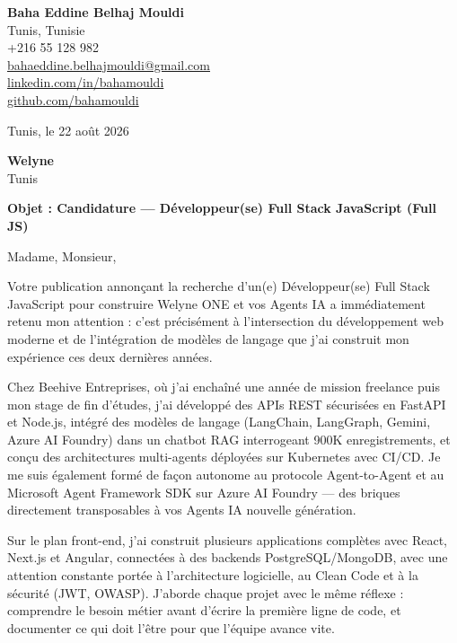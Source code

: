 \documentclass[a4paper,11pt]{article}
\begin{document}
\begin{flushright}
{\bfseries Baha Eddine Belhaj Mouldi}\\
Tunis, Tunisie\\
+216 55 128 982\\
\href{mailto:bahaeddine.belhajmouldi@gmail.com}{bahaeddine.belhajmouldi@gmail.com}\\
\href{https://linkedin.com/in/bahamouldi}{linkedin.com/in/bahamouldi}\\
\href{https://github.com/bahamouldi}{github.com/bahamouldi}
\end{flushright}

\vspace{0.8cm}

\begin{flushleft}
Tunis, le 22 août 2026

\vspace{0.8cm}

{\bfseries Welyne}\\
Tunis

\vspace{0.6cm}

{\bfseries Objet : Candidature --- Développeur(se) Full Stack JavaScript (Full JS)}
\end{flushleft}

\vspace{0.6cm}

Madame, Monsieur,

Votre publication annonçant la recherche d'un(e) Développeur(se) Full Stack JavaScript pour construire Welyne ONE et vos Agents IA a immédiatement retenu mon attention : c'est précisément à l'intersection du développement web moderne et de l'intégration de modèles de langage que j'ai construit mon expérience ces deux dernières années.

Chez Beehive Entreprises, où j'ai enchaîné une année de mission freelance puis mon stage de fin d'études, j'ai développé des APIs REST sécurisées en FastAPI et Node.js, intégré des modèles de langage (LangChain, LangGraph, Gemini, Azure AI Foundry) dans un chatbot RAG interrogeant 900K enregistrements, et conçu des architectures multi-agents déployées sur Kubernetes avec CI/CD. Je me suis également formé de façon autonome au protocole Agent-to-Agent et au Microsoft Agent Framework SDK sur Azure AI Foundry --- des briques directement transposables à vos Agents IA nouvelle génération.

Sur le plan front-end, j'ai construit plusieurs applications complètes avec React, Next.js et Angular, connectées à des backends PostgreSQL/MongoDB, avec une attention constante portée à l'architecture logicielle, au Clean Code et à la sécurité (JWT, OWASP). J'aborde chaque projet avec le même réflexe : comprendre le besoin métier avant d'écrire la première ligne de code, et documenter ce qui doit l'être pour que l'équipe avance vite.
\end{document}
